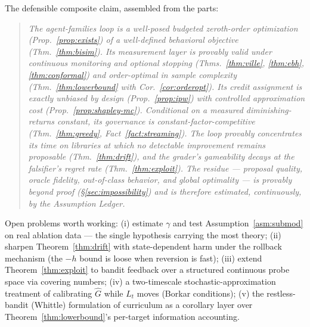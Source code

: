 \documentclass[11pt]{article}
\theoremstyle{plain}
\theoremstyle{definition}
\theoremstyle{remark}
\begin{document}
The defensible composite claim, assembled from the parts:

\begin{quote}
\itshape
The agent-families loop is a well-posed budgeted zeroth-order optimization
(Prop.~\ref{prop:exists}) of a well-defined behavioral objective
(Thm.~\ref{thm:bisim}). Its measurement layer is provably valid under
continuous monitoring and optional stopping (Thms.~\ref{thm:ville},
\ref{thm:ebh}, \ref{thm:conformal}) and order-optimal in sample complexity
(Thm.~\ref{thm:lowerbound} with Cor.~\ref{cor:orderopt}). Its credit
assignment is exactly unbiased by design (Prop.~\ref{prop:ipw}) with
controlled approximation cost (Prop.~\ref{prop:shapley-mc}). Conditional on a
measured diminishing-returns constant, its governance is
constant-factor-competitive (Thm.~\ref{thm:greedy},
Fact~\ref{fact:streaming}). The loop provably concentrates its time on
libraries at which no detectable improvement remains proposable
(Thm.~\ref{thm:drift}), and the grader's gameability decays at the
falsifier's regret rate (Thm.~\ref{thm:exploit}). The residue --- proposal
quality, oracle fidelity, out-of-class behavior, and global optimality ---
is provably beyond proof (\S\ref{sec:impossibility}) and is therefore
estimated, continuously, by the Assumption Ledger.
\end{quote}

Open problems worth working: (i) estimate $\gamma$ and test
Assumption~\ref{asm:submod} on real ablation data --- the single hypothesis
carrying the most theory; (ii) sharpen Theorem~\ref{thm:drift} with
state-dependent harm under the rollback mechanism (the $-h$ bound is
loose when reversion is fast); (iii) extend Theorem~\ref{thm:exploit} to
bandit feedback over a structured continuous probe space via covering
numbers; (iv) a two-timescale stochastic-approximation treatment of
calibrating $\widehat G$ while $L_t$ moves (Borkar conditions); (v) the
restless-bandit (Whittle) formulation of curriculum as a corollary layer over
Theorem~\ref{thm:lowerbound}'s per-target information accounting.
\end{document}

